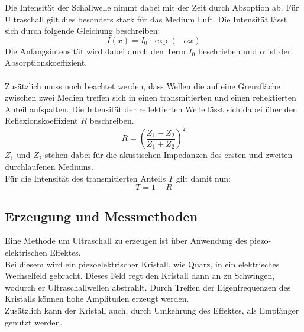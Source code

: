\noindent
Die Intensität der Schallwelle nimmt dabei mit der Zeit durch Absoption ab. 
Für Ultraschall gilt dies besonders stark für das Medium Luft.
Die Intensität lässt sich durch folgende Gleichung beschreiben:
\begin{equation*}
  I(x)=I_0\cdot \exp{(-\alpha x)}  
\end{equation*}
Die Anfangsintensität wird dabei durch den Term $I_0$ beschrieben und $\alpha$ ist der Absorptionskoeffizient.\\\\
Zusätzlich muss noch beachtet werden, dass Wellen die auf eine Grenzfläche zwischen zwei Medien treffen sich in einen transmitierten und einen reflektierten Anteil aufspalten.
Die Intensität der reflektierten Welle lässt sich dabei über den Reflexionskoeffizient $R$ beschreiben.
\begin{equation*}
    R=\left(\frac{Z_1-Z_2}{Z_1+Z_2}\right)^2
\end{equation*}
$Z_1$ und $Z_2$ stehen dabei für die akustischen Impedanzen des ersten und zweiten durchlaufenen Mediums.\\
Für die Intensität des transmitierten Anteils $T$ gilt damit nun:
\begin{equation*}
    T=1-R
\end{equation*}




\subsection{Erzeugung und Messmethoden}

Eine Methode um Ultraschall zu erzeugen ist über Anwendung des piezo-elektrischen Effektes.\\
Bei diesem wird ein piezoelektrischer Kristall, wie Quarz, in ein elektrisches Wechselfeld gebracht. 
Dieses Feld regt den Kristall dann an zu Schwingen, wodurch er Ultraschallwellen abstrahlt. 
Durch Treffen der Eigenfrequenzen des Kristalls können hohe Amplituden erzeugt werden.\\
Zusätzlich kann der Kristall auch, durch Umkehrung des Effektes, als Empfänger genutzt werden.\\\\

